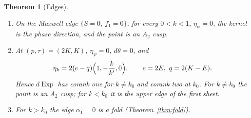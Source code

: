 \documentclass[11pt]{article}
\newtheorem{theorem}{Theorem}[section]
\theoremstyle{remark}
\newcommand{\Exp}{\operatorname{Exp}}
\begin{document}
\begin{theorem}[Edges]\label{thm:edges}
\begin{enumerate}[nosep,leftmargin=*]
\item[(i)] On the Maxwell edge $\{S=0,\ f_1=0\}$, for every $0<k<1$,
      $\eta_\psi=0$, the kernel is the phase direction, and the point is an
      $A_2$ cusp.
\item[(ii)] At $(p,\tau)=(2K,K)$, $\eta_\psi=0$, $d\theta=0$, and
      \[
       \eta_k=2(e-q)\Bigl(1,-\frac k{k'},0\Bigr),\qquad e=2E,\ q=2(K-E).
      \]
      Hence $d\Exp$ has corank one for $k\ne k_0$ and corank two at $k_0$.
      For $k\ne k_0$ the point is an $A_2$ cusp; for $k<k_0$ it is the
      upper edge of the first sheet.
\item[(iii)] For $k>k_0$ the edge $\alpha_1=0$ is a fold
      (Theorem~\ref{thm:fold}).
\end{enumerate}
\end{theorem}
\end{document}
